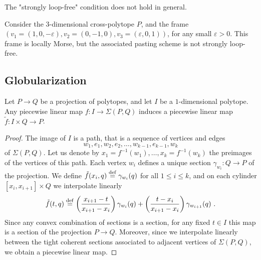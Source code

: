 
The "strongly loop-free" condition does not hold in general.

\begin{example}
	Consider the $3$-dimensional cross-polytope $P$, and the frame $(v_1=(1,0,-\varepsilon),v_2=(0,-1,0),v_3=(\varepsilon,0,1))$, for any small $\varepsilon >0$.
	This frame is locally Morse, but the associated pasting scheme is not strongly loop-free.
\end{example}

\subsection{Globularization}
\label{ss:globularization}


\begin{lemma}
	\label{l:adjunction-I}
	Let $P \to Q$ be a projection of polytopes, and let $I$ be a $1$-dimensional polytope.
	Any piecewise linear map $f \colon I \to \Sigma(P,Q)$ induces a piecewise linear map $\tilde f \colon I \times Q \to P$.
\end{lemma}

\begin{proof}
	The image of $I$ is a path, that is a sequence of vertices and edges $$w_1,e_1,w_2,e_2,\ldots,w_{k-1},e_{k-1},w_k$$ of $\Sigma(P,Q)$.
	Let us denote by $x_1=f^{-1}(w_1),\ldots, x_k=f^{-1}(w_k)$ the preimages of the vertices of this path.
	Each vertex $w_i$ defines a unique section $\gamma_{w_i} : Q \to P$ of the projection.
	We define $\tilde f (x_i, q) \stackrel{\mathrm{def}}{=} \gamma_{w_i}(q)$ for all $1 \leq i \leq k$, and on each cylinder $[x_i,x_{i+1}] \times Q$ we interpolate linearly
	\[
	\tilde f (t,q) \defeq \left( \frac{x_{i+1}-t}{x_{i+1}-x_i} \right) \gamma_{w_i}(q) + \left( \frac{t-x_i}{x_{i+1}-x_i} \right) \gamma_{w_{i+1}}(q) \ .
	\]
	Since any convex combination of sections is a section, for any fixed $t\in I$ this map is a section of the projection $P \to Q$.
	Moreover, since we interpolate linearly between the tight coherent sections associated to adjacent vertices of $\Sigma(P,Q)$, we obtain a piecewise linear map.
\end{proof}

